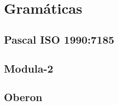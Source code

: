 
\chapter{Gramáticas}
\label{chap:grammars}

\section{Pascal ISO 1990:7185}



\section{Modula-2}



\section{Oberon}

